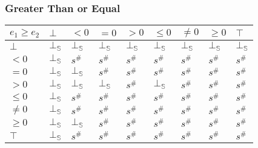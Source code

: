 \documentclass{beamer}
\begin{document}
                                \begin{frame}
                                    \frametitle{Greater Than or Equal}
                \begin{table}
                    \begin{tabular}{|l|l|l|l|l|l|l|l|l|}
                    \hline
                    $e_1 \ge e_2$ & $\bot$ & $<0$   & $=0$   & $>0$   & $\le 0$ & $\ne 0$ & $\ge 0$ & $\top$ \\ \hline
                    $\bot$        & $\bot_\mathbb{S}$ & $\bot_\mathbb{S}$ & $\bot_\mathbb{S}$ & $\bot_\mathbb{S}$ & $\bot_\mathbb{S}$  & $\bot_\mathbb{S}$  & $\bot_\mathbb{S}$  & $\bot_\mathbb{S}$ \\ \hline
                    $<0$          & $\bot_\mathbb{S}$ & $s^\#$ & $s^\#$ & $s^\#$ & $s^\#$  & $s^\#$  & $s^\#$  & $s^\#$ \\ \hline
                    $=0$          & $\bot_\mathbb{S}$ & $\bot_\mathbb{S}$ & $s^\#$ & $s^\#$ & $s^\#$  & $s^\#$  & $s^\#$  & $s^\#$ \\ \hline
                    $>0$          & $\bot_\mathbb{S}$ & $\bot_\mathbb{S}$ & $\bot_\mathbb{S}$ & $s^\#$ & $\bot_\mathbb{S}$  & $s^\#$  & $s^\#$  & $s^\#$ \\ \hline
                    $\le 0$       & $\bot_\mathbb{S}$ & $s^\#$ & $s^\#$ & $s^\#$ & $s^\#$  & $s^\#$  & $s^\#$  & $s^\#$ \\ \hline
                    $\ne 0$       & $\bot_\mathbb{S}$ & $s^\#$ & $s^\#$ & $s^\#$ & $s^\#$  & $s^\#$  & $s^\#$  & $s^\#$ \\ \hline
                    $\ge 0$       & $\bot_\mathbb{S}$ & $\bot_\mathbb{S}$ & $s^\#$ & $s^\#$ & $s^\#$  & $s^\#$  & $s^\#$  & $s^\#$ \\ \hline
                    $\top$        & $\bot_\mathbb{S}$ & $s^\#$ & $s^\#$ & $s^\#$ & $s^\#$  & $s^\#$  & $s^\#$  & $s^\#$ \\ \hline
                    \end{tabular}
                    \end{table}
                \end{frame}
\end{document}
